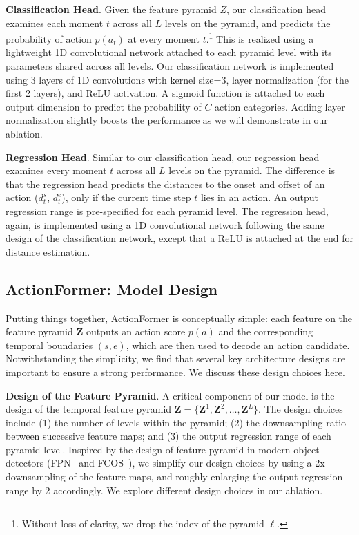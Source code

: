 \smallskip
\noindent \textbf{Classification Head}. 
Given the feature pyramid $Z$, our classification head examines each moment $t$ across all $L$ levels on the pyramid, and predicts the probability of action $p(a_{t})$ at every moment $t$.\footnote{Without loss of clarity, we drop the index of the pyramid $\ell$.} This is realized using a lightweight 1D convolutional network attached to each pyramid level with its parameters shared across all levels. Our classification network is implemented using 3 layers of 1D convolutions with kernel size=3, layer normalization (for the first 2 layers), and ReLU activation. A sigmoid function is attached to each output dimension to predict the probability of $C$ action categories. Adding layer normalization slightly boosts the performance as we will demonstrate in our ablation. 

\smallskip
\noindent \textbf{Regression Head}. 
Similar to our classification head, our regression head examines every moment $t$ across all $L$ levels on the pyramid. The difference is that the regression head predicts the distances to the onset and offset of an action ($d^s_{t}$, $d^e_{t}$), only if the current time step $t$ lies in an action. An output regression range is pre-specified for each pyramid level. The regression head, again, is implemented using a 1D convolutional network following the same design of the classification network, except that a ReLU is attached at the end for distance estimation. 

\subsection{ActionFormer: Model Design}\label{sec:method:details}

Putting things together, ActionFormer is conceptually simple: each feature on the feature pyramid $\mathbf{Z}$ outputs an action score $p(a)$ and the corresponding temporal boundaries $(s, e)$, which are then used to decode an action candidate. Notwithstanding the simplicity, we find that several key architecture designs are important to ensure a strong performance. We discuss these design choices here. 

\smallskip
\noindent \textbf{Design of the Feature Pyramid}. A critical component of our model is the design of the temporal feature pyramid $\mathbf{Z}=\{\mathbf{Z}^1, \mathbf{Z}^2, \ldots, \mathbf{Z}^L\}$. The design choices include (1) the number of levels within the pyramid; (2) the downsampling ratio between successive feature maps; and (3) the output regression range of each pyramid level. Inspired by the design of feature pyramid in modern object detectors (FPN~\cite{fpncvpr2017} and FCOS~\cite{fcosiccv2019}), we simplify our design choices by using a 2x downsampling of the feature maps, and roughly enlarging the output regression range by 2 accordingly. We explore different design choices in our ablation.

